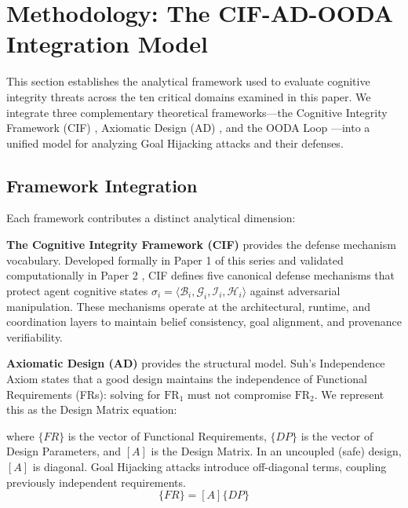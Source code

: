 \documentclass[
]{article}
\begin{document}
\newpage

\section{Methodology: The CIF-AD-OODA Integration
Model}\label{sec:methodology}

This section establishes the analytical framework used to evaluate
cognitive integrity threats across the ten critical domains examined in
this paper. We integrate three complementary theoretical
frameworks---the Cognitive Integrity Framework (CIF)
\cite{friedman2026cogsec1}, Axiomatic Design (AD)
\cite{suh1990principles, suh2001axiomatic}, and the OODA Loop
\cite{boyd1987patterns}---into a unified model for analyzing Goal
Hijacking attacks and their defenses.

\subsection{Framework Integration}\label{framework-integration}

Each framework contributes a distinct analytical dimension:

\textbf{The Cognitive Integrity Framework (CIF)} provides the defense
mechanism vocabulary. Developed formally in Paper 1 of this series
\cite{friedman2026cogsec1} and validated computationally in Paper 2
\cite{friedman2026cogsec2}, CIF defines five canonical defense
mechanisms that protect agent cognitive states
\(\sigma_i = \langle \mathcal{B}_i, \mathcal{G}_i, \mathcal{I}_i, \mathcal{H}_i \rangle\)
against adversarial manipulation. These mechanisms operate at the
architectural, runtime, and coordination layers to maintain belief
consistency, goal alignment, and provenance verifiability.

\textbf{Axiomatic Design (AD)} provides the structural model. Suh's
Independence Axiom \cite{suh2001axiomatic} states that a good design
maintains the independence of Functional Requirements (FRs): solving for
\(\text{FR}_1\) must not compromise \(\text{FR}_2\). We represent this
as the Design Matrix equation:

where \(\{FR\}\) is the vector of Functional Requirements, \(\{DP\}\) is
the vector of Design Parameters, and \([A]\) is the Design Matrix. In an
uncoupled (safe) design, \([A]\) is diagonal. Goal Hijacking attacks
introduce off-diagonal terms, coupling previously independent
requirements. \begin{equation}
\{FR\} = [A]\{DP\}
\label{eq:meth_design_matrix}
\end{equation}
\end{document}
